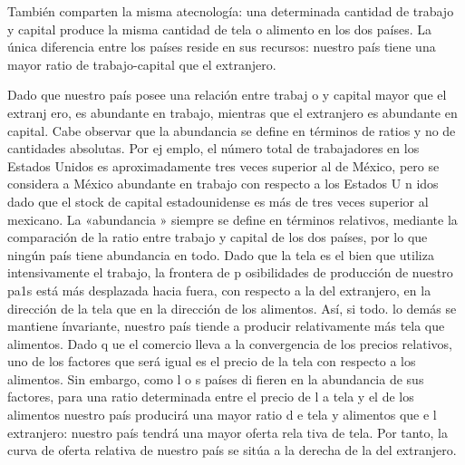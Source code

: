 \documentclass[10pt,a4paper]{article}
\begin{document}
También comparten la misma atecnología: una determinada cantidad de trabajo y capital produce la misma cantidad de tela o alimento en los dos países. La única diferencia entre los países reside en sus recursos: nuestro país tiene una mayor ratio de trabajo-capital que el extranjero.

Dado que nuestro país posee una relación entre trabaj o y capital mayor que el extranj ero, es abundante en trabajo, mientras que el extranjero es abundante en capital. Cabe observar que la abundancia se define en términos de ratios y no de cantidades absolutas. Por ej emplo, el número total de trabajadores en los Estados Unidos es aproximadamente tres veces superior al de México, pero se considera a México abundante en trabajo con respecto a los Estados U n idos dado que el stock de capital estadounidense es más de tres veces superior al mexicano. La «abundancia » siempre se define en términos relativos, mediante la comparación de la ratio entre trabajo y capital de los dos países, por lo que ningún país tiene abundancia en todo. Dado que la tela es el bien que utiliza intensivamente el trabajo, la frontera de p osibilidades de producción de nuestro pa1s está más desplazada hacia fuera, con respecto a la del extranjero, en la dirección de la tela que en la dirección de los alimentos. Así, si todo. lo demás se mantiene ínvariante, nuestro país tiende a producir relativamente más tela que alimentos. Dado q ue el comercio lleva a la convergencia de los precios relativos, uno de los factores que será igual es el precio de la tela con respecto a los alimentos. Sin embargo, como l o s países di fieren en la abundancia de sus factores, para una ratio determinada entre el precio de l a tela y el de los alimentos nuestro país producirá una mayor ratio d e tela y alimentos que e l extranjero: nuestro país tendrá una mayor oferta rela tiva de tela. Por tanto, la curva de oferta relativa de nuestro país se sitúa a la derecha de la del extranjero.
\end{document}
